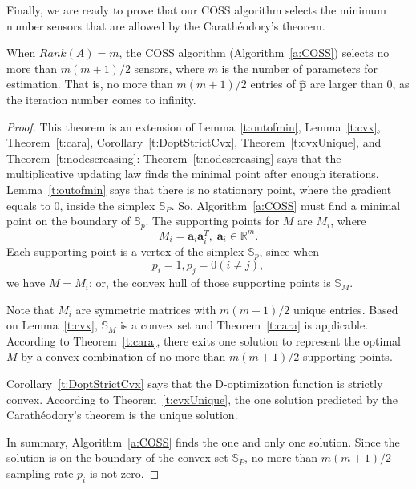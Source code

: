 Finally, we are ready to prove that our COSS algorithm selects the minimum number sensors that are allowed by the Carath\'{e}odory's theorem.


\begin{thm}\label{t:minsen} %
When $Rank(A)=m$, the COSS algorithm (Algorithm~\ref{a:COSS}) selects no more than $m(m+1)/2$ sensors, where $m$ is the number of parameters for estimation. That is, no more than $m(m+1)/2$ entries of $\mathbf{\hat{p}}$ are larger than 0, as the iteration number comes to infinity.
\end{thm}
\begin{proof}
This theorem is an extension of Lemma~\ref{t:outofmin}, Lemma~\ref{t:cvx}, Theorem~\ref{t:cara}, Corollary~\ref{t:DoptStrictCvx}, Theorem~\ref{t:cvxUnique}, and Theorem~\ref{t:nodescreasing}: Theorem~\ref{t:nodescreasing} says that the multiplicative updating law finds the minimal point after enough iterations.
    Lemma~\ref{t:outofmin} says that there is no stationary point, where the gradient equals to 0, inside the simplex $\mathbb{S}_P$. So, Algorithm~\ref{a:COSS} must find a minimal point on the boundary of $\mathbb{S}_p$. The supporting points for $M$ are $M_i$, where
    $$M_i = \mathbf{a}_i \mathbf{a}_i^T, \; \mathbf{a}_i\in \mathbb{R}^m.$$
     Each supporting point is a vertex of the simplex $\mathbb{S}_p$,
    since when
    $$p_i=1, p_j=0 (i\neq j),$$
     we have $M=M_i$; or, the convex hull of those supporting points is $\mathbb{S}_M$.

    Note that $M_i$ are symmetric matrices with $m(m+1)/2$ unique entries. Based on Lemma~\ref{t:cvx}, $\mathbb{S}_M$ is a convex set and Theorem~\ref{t:cara} is applicable. According to  Theorem~\ref{t:cara}, there exits one solution to represent the optimal $M$ by a convex combination of no more than $m(m+1)/2$ supporting points.

Corollary~\ref{t:DoptStrictCvx} says that the D-optimization function is strictly convex. According to Theorem~\ref{t:cvxUnique}, the one solution predicted by the Carath\'{e}odory's theorem is the unique solution.

    In summary, Algorithm~\ref{a:COSS} finds the one and only one solution. Since the solution is on the boundary of the convex set $\mathbb{S}_P$, no more than $m(m+1)/2$ sampling rate $p_i$ is not zero.
\end{proof}

